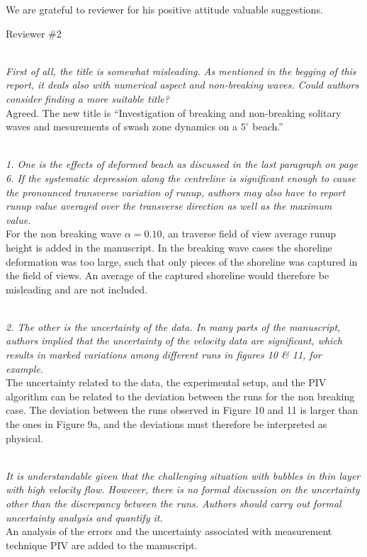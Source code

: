 \newcommand{\refpoint}[1]{\ \vspace{0.3cm}\\ {\em #1}\  \vspace{0.3cm}\\ }
\newcommand{\todo}[1]{\ \\ {\bf To do: #1}}

We are grateful to reviewer for his positive attitude valuable suggestions.

Reviewer \#2

\refpoint{First of all, the title is somewhat misleading. As mentioned in the begging of this report, it deals also with 
numerical aspect and non-breaking waves. Could authors consider finding a more suitable title?}
Agreed.
The new title is ``Investigation of breaking and non-breaking solitary waves and mesurements of swash zone dynamics on 
a $5^\circ$ beach.''

\refpoint{1. One is the effects of deformed beach as discussed in the last paragraph on page 6. If the systematic depression along the centreline is significant enough to cause the pronounced transverse variation of runup, authors may also have to report runup value averaged over the transverse direction as well as the maximum value.}

For the non breaking wave $\alpha =0.10$, an traverse field of view average runup height is added in the manuscript. In the breaking wave cases the shoreline deformation was too large, such that only pieces of the shoreline was captured in the field of views. An average of the captured shoreline would therefore be misleading and are not included. 

\refpoint{2. The other is the uncertainty of the data. In many parts of the manuscript, authors implied that the uncertainty of the velocity data are significant, which results in marked variations among different runs in figures 10 \& 11, for example.}

The uncertainty related to the data, the experimental setup, and the PIV algorithm can be related to the deviation between the runs for the non breaking case. The deviation  between the runs observed in Figure 10 and 11 is larger than the ones in Figure 9a, and the deviations must therefore be interpreted as physical.


\refpoint{ It is understandable given that the challenging situation with bubbles in thin layer with high velocity flow. However, there is no formal discussion on the uncertainty other than the discrepancy between the runs. Authors should carry out formal uncertainty analysis and quantify it.}

An analysis of the errors and the uncertainty associated with measurement technique PIV are added to the manuscript.


